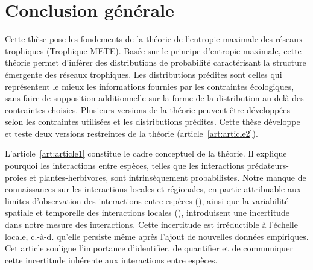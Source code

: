 
\francais   
 
\chapter{Conclusion générale}

Cette thèse pose les fondements de la théorie de l'entropie maximale des réseaux
trophiques (Trophique-METE). Basée sur le principe d'entropie maximale, cette
théorie permet d'inférer des distributions de probabilité caractérisant la
structure émergente des réseaux trophiques. Les distributions prédites sont
celles qui représentent le mieux les informations fournies par les contraintes
écologiques, sans faire de supposition additionnelle sur la forme de la
distribution au-delà des contraintes choisies. Plusieurs versions de la théorie
peuvent être développées selon les contraintes utilisées et les distributions
prédites. Cette thèse développe et teste deux versions restreintes de la théorie
(article~\ref{art:article2}). 

L'article~\ref{art:article1} constitue le cadre conceptuel de la théorie. Il
explique pourquoi les interactions entre espèces, telles que les interactions
prédateurs-proies et plantes-herbivores, sont intrinsèquement probabilistes.
Notre manque de connaissances sur les interactions locales et régionales, en
partie attribuable aux limites d'observation des interactions entre espèces
(\cite{Jordano2016Sampling}), ainsi que la variabilité spatiale et temporelle
des interactions locales (\cite{Poisot2015Species}), introduisent une
incertitude dans notre mesure des interactions. Cette incertitude est
irréductible à l'échelle locale, c.-à-d. qu'elle persiste même après l'ajout de
nouvelles données empiriques. Cet article souligne l'importance d'identifier, de
quantifier et de communiquer cette incertitude inhérente aux interactions entre
espèces. 

